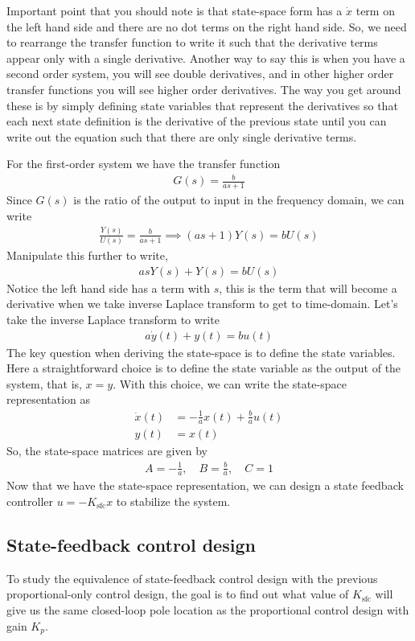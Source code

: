 \documentclass{ee122_notes}
\begin{document}
Important point that you should note is that state-space form has a $\dot{x}$ term on the left hand side and there are no dot terms on the right hand side. So, we need to rearrange the transfer function to write it such that the derivative terms appear only with a single derivative. Another way to say this is when you have a second order system, you will see double derivatives, and in other higher order transfer functions you will see higher order derivatives. The way you get around these is by simply defining state variables that represent the derivatives so that each next state definition is the derivative of the previous state until you can write out the equation such that there are only single derivative terms. 

For the first-order system we have the transfer function
\begin{align*}
    G(s) = \frac{b}{as + 1}
\end{align*}
Since $G(s)$ is the ratio of the output to input in the frequency domain, we can write
\begin{align*}
    \frac{Y(s)}{U(s)} = \frac{b}{as + 1} \implies (as + 1)Y(s) = bU(s)
\end{align*}
Manipulate this further to write,
\begin{align*}
    asY(s) + Y(s) = bU(s) 
\end{align*}
Notice the left hand side has a term with $s$, this is the term that will become a derivative when we take inverse Laplace transform to get to time-domain. Let's take the inverse Laplace transform to write 
\begin{align*}
    a\dot y(t) + y(t) = bu(t)
\end{align*}
The key question when deriving the state-space is to define the state variables. Here a straightforward choice is to define the state variable as the output of the system, that is, $x = y$. With this choice, we can write the state-space representation as
\begin{align*}
    \dot x(t) &= -\frac{1}{a}x(t) + \frac{b}{a}u(t) \\
    y(t) &= x(t)
\end{align*}
So, the state-space matrices are given by
\begin{align*}
    A = -\frac{1}{a}, \quad B = \frac{b}{a}, \quad C = 1
\end{align*}
Now that we have the state-space representation, we can design a state feedback controller $u = -K_{\text{sfc}}x$ to stabilize the system. 
\subsection{State-feedback control design}
To study the equivalence of state-feedback control design with the previous proportional-only control design, the goal is to find out what value of $K_{\text{sfc}}$ will give us the same closed-loop pole location as the proportional control design with gain $K_p$. 
\end{document}
